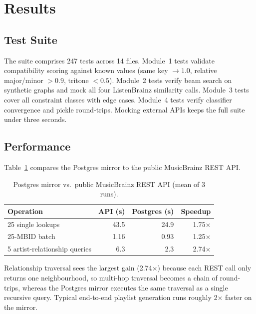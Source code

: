 \section{Results}
\label{sec:results}

\subsection{Test Suite}

The suite comprises 247 tests across 14 files. Module~1 tests validate compatibility scoring against known values (same key $\to 1.0$, relative major/minor $> 0.9$, tritone $< 0.5$). Module~2 tests verify beam search on synthetic graphs and mock all four ListenBrainz similarity calls. Module~3 tests cover all constraint classes with edge cases. Module~4 tests verify classifier convergence and pickle round-trips. Mocking external APIs keeps the full suite under three seconds.

\subsection{Performance}
\label{sec:results-perf}

Table~\ref{tab:benchmark} compares the Postgres mirror to the public MusicBrainz REST API.

\begin{table}[h]
\centering
\caption{Postgres mirror vs.\ public MusicBrainz REST API (mean of 3 runs).}
\label{tab:benchmark}
\begin{tabular}{@{}lrrr@{}}
\toprule
\textbf{Operation} & \textbf{API (s)} & \textbf{Postgres (s)} & \textbf{Speedup} \\
\midrule
25 single lookups & 43.5 & 24.9 & 1.75$\times$ \\
25-MBID batch & 1.16 & 0.93 & 1.25$\times$ \\
5 artist-relationship queries & 6.3 & 2.3 & 2.74$\times$ \\
\bottomrule
\end{tabular}
\end{table}

Relationship traversal sees the largest gain (2.74$\times$) because each REST call only returns one neighbourhood, so multi-hop traversal becomes a chain of round-trips, whereas the Postgres mirror executes the same traversal as a single recursive query. Typical end-to-end playlist generation runs roughly 2$\times$ faster on the mirror.


